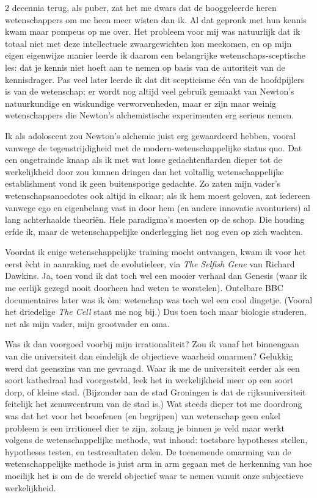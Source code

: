\documentclass[12pt,a4paper]{article}
\begin{document}
2 decennia terug, als puber, zat het me dwars dat de hooggeleerde heren wetenschappers om me heen meer wisten dan ik. Al dat gepronk met hun kennis kwam maar pompeus op me over. Het probleem voor mij was natuurlijk dat ik totaal niet met deze intellectuele zwaargewichten kon meekomen, en op mijn eigen eigenwijze manier leerde ik daarom een belangrijke wetenschaps-sceptische les: dat je kennis niet hoeft aan te nemen op basis van de autoriteit van de kennisdrager. Pas veel later leerde ik dat dit scepticisme één van de hoofdpijlers is van de wetenschap; er wordt nog altijd veel gebruik gemaakt van Newton's natuurkundige en wiskundige verworvenheden, maar er zijn maar weinig wetenschappers die Newton's alchemistische experimenten erg serieus nemen.

Ik als adoloscent zou Newton's alchemie juist erg gewaardeerd hebben, vooral vanwege de tegenstrijdigheid met de modern-wetenschappelijke status quo. Dat een ongetrainde knaap als ik met wat losse gedachtenflarden dieper tot de werkelijkheid door zou kunnen dringen dan het voltallig wetenschappelijke establishment vond ik geen buitensporige gedachte. Zo zaten mijn vader's wetenschapsanocdotes ook altijd in elkaar; als ik hem moest geloven, zat iedereen vanwege ego en eigenbelang vast in door hem (en andere innovatie avonturiers) al lang achterhaalde theoriën. Hele paradigma's moesten op de schop. Die houding erfde ik, maar de wetenschappelijke onderlegging liet nog even op zich wachten.

Voordat ik enige wetenschappelijke training mocht ontvangen, kwam ik voor het eerst ècht in aanraking met de evolutieleer, via \emph{The Selfish Gene} van Richard Dawkins. Ja, toen vond ik dat toch wel een mooier verhaal dan Genesis (waar ik me eerlijk gezegd nooit doorheen had weten te worstelen). Ontelbare BBC documentaires later was ik òm: wetenchap was toch wel een cool dingetje. (Vooral het driedelige \emph{The Cell} staat me nog bij.) Dus toen toch maar biologie studeren, net als mijn vader, mijn grootvader en oma.

Was ik dan voorgoed voorbij mijn irrationaliteit? Zou ik vanaf het binnengaan van die universiteit dan eindelijk de objectieve waarheid omarmen? Gelukkig werd dat geenszins van me gevraagd. Waar ik me de universiteit eerder als een soort kathedraal had voorgesteld, leek het in werkelijkheid meer op een soort dorp, of kleine stad. (Bijzonder aan de stad Groningen is dat de rijksuniversiteit feitelijk het zenuwcentrum van de stad is.) Wat steeds dieper tot me doordrong was dat het voor het beoefenen (en begrijpen) van wetenschap geen enkel probleem is een irritioneel dier te zijn, zolang je binnen je veld maar werkt volgens de wetenschappelijke methode, wat inhoud: toetsbare hypotheses stellen, hypotheses testen, en testresultaten delen. De toenemende omarming van de wetenschappelijke methode is juist arm in arm gegaan met de herkenning van hoe moeilijk het is om de de wereld objectief waar te nemen vanuit onze subjectieve werkelijkheid.
\end{document}
